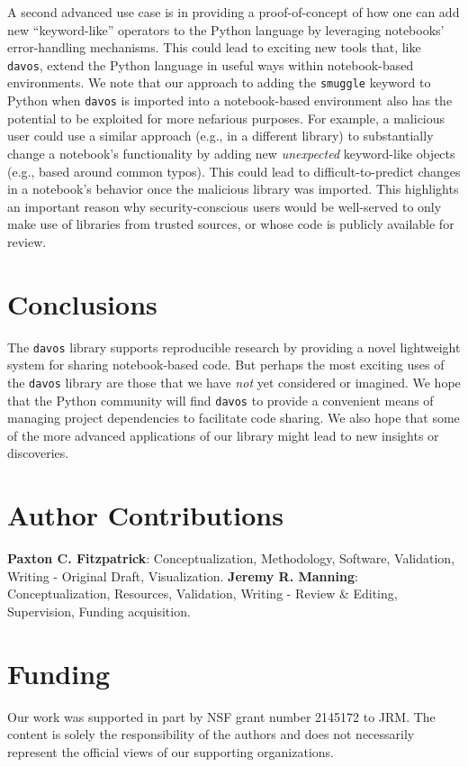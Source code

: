 \documentclass[preprint,12pt, a4paper]{elsarticle}
\begin{document}
A second advanced use case is in providing a proof-of-concept of how
one can add new ``keyword-like'' operators to the Python language by
leveraging notebooks' error-handling mechanisms.  This could lead to
exciting new tools that, like \texttt{davos}, extend the Python
language in useful ways within notebook-based environments.  We note that
our approach to adding the \texttt{smuggle} keyword to Python when
\texttt{davos} is imported into a notebook-based environment also has
the potential to be exploited for more nefarious purposes.  For
example, a malicious user could use a similar approach (e.g., in a
different library) to substantially change a notebook's functionality
by adding new \textit{unexpected} keyword-like objects (e.g., based
around common typos).  This could lead to difficult-to-predict changes
in a notebook's behavior once the malicious library was imported.
This highlights an important reason why security-conscious users would
be well-served to only make use of libraries from trusted sources, or
whose code is publicly available for review.

\section{Conclusions}

The \texttt{davos} library supports reproducible research by providing
a novel lightweight system for sharing notebook-based code.  But
perhaps the most exciting uses of the \texttt{davos} library are those
that we have \textit{not} yet considered or imagined.  We hope that
the Python community will find \texttt{davos} to provide a convenient
means of managing project dependencies to facilitate code sharing.  We
also hope that some of the more advanced applications of our library
might lead to new insights or discoveries.


\section*{Author Contributions}
\textbf{Paxton C. Fitzpatrick}: Conceptualization, Methodology,
Software, Validation, Writing - Original Draft,
Visualization. \textbf{Jeremy R. Manning}: Conceptualization,
Resources, Validation, Writing - Review \& Editing, Supervision, Funding
acquisition.

\section*{Funding}
Our work was supported in part by NSF grant number 2145172 to JRM.
The content is solely the responsibility of the authors and does not necessarily represent the official views of our supporting organizations.
\end{document}
